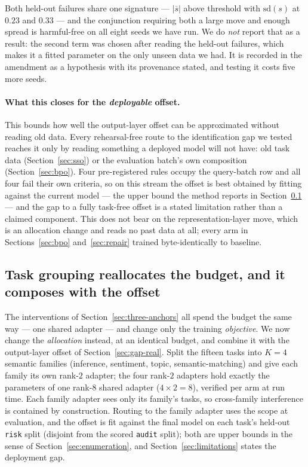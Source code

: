 Both held-out failures share one signature --- $|\overline{s}|$ above threshold with
$\mathrm{sd}(s)$ at $0.23$ and $0.33$ --- and the conjunction requiring both a large
move and enough spread is harmful-free on all eight seeds we have run. We do
\emph{not} report that as a result: the second term was chosen after reading the
held-out failures, which makes it a fitted parameter on the only unseen data we had.
It is recorded in the amendment as a hypothesis with its provenance stated, and
testing it costs five more seeds.

\paragraph{What this closes for the \emph{deployable} offset.}
This bounds how well the output-layer offset can be approximated without reading old
data. Every rehearsal-free route to the identification gap we tested reaches it only
by reading something a deployed model will not have: old task data
(Section~\ref{sec:sso}) or the evaluation batch's own composition
(Section~\ref{sec:bpo}). Four pre-registered rules occupy the query-batch row and all
four fail their own criteria, so on this stream the offset is best obtained by fitting
against the current model --- the upper bound the method reports in
Section~\ref{sec:combined} --- and the gap to a fully task-free offset is a stated
limitation rather than a claimed component. This does not bear on the
representation-layer move, which is an allocation change and reads no past data at
all; every arm in Sections~\ref{sec:bpo} and~\ref{sec:repair} trained byte-identically
to baseline.

\subsection{Task grouping reallocates the budget, and it composes with the offset}
\label{sec:combined}

The interventions of Section~\ref{sec:three-anchors} all spend the budget the same
way --- one shared adapter --- and change only the training \emph{objective}. We now
change the \emph{allocation} instead, at an identical budget, and combine it with the
output-layer offset of Section~\ref{sec:gap-real}. Split the fifteen tasks into
$K{=}4$ semantic families (inference, sentiment, topic, semantic-matching) and give
each family its own rank-$2$ adapter; the four rank-$2$ adapters hold exactly the
parameters of one rank-$8$ shared adapter ($4\times2=8$), verified per arm at run
time. Each family adapter sees only its family's tasks, so cross-family interference
is contained by construction. Routing to the family adapter uses the scope at
evaluation, and the offset is fit against the final model on each task's held-out
\texttt{risk} split (disjoint from the scored \texttt{audit} split); both are upper
bounds in the sense of Section~\ref{sec:enumeration}, and Section~\ref{sec:limitations}
states the deployment gap.

